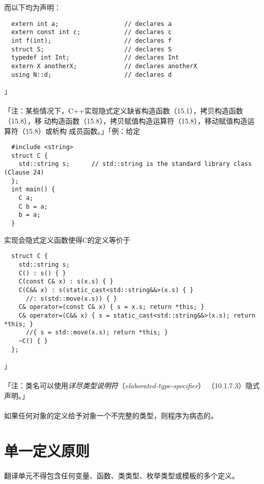 而以下均为声明：
\begin{lstlisting}
  extern int a;                  // declares a
  extern const int c;            // declares c
  int f(int);                    // declares f
  struct S;                      // declares S
  typedef int Int;               // declares Int
  extern X anotherX;             // declares anotherX
  using N::d;                    // declares d
\end{lstlisting}
」

\paragraph{}
「注：某些情况下，C++实现隐式定义缺省构造函数（15.1），拷贝构造函数（15.8），移
动构造函数（15.8），拷贝赋值构造运算符（15.8），移动赋值构造运算符（15.8）或析构
成员函数。」「例：给定
\begin{lstlisting}
  #include <string>
  struct C {
    std::string s;      // std::string is the standard library class (Clause 24)
  };
  int main() {
    C a;
    C b = a;
    b = a;
  }
\end{lstlisting}
实现会隐式定义函数使得C的定义等价于
\begin{lstlisting}
  struct C {
    std::string s;
    C() : s() { }
    C(const C& x) : s(x.s) { }
    C(C&& x) : s(static_cast<std::string&&>(x.s) { }
      //: s(std::move(x.s)) { }
    C& operator=(const C& x) { s = x.s; return *this; }
    C& operator=(C&& x) { s = static_cast<std::string&&>(x.s); return *this; }
      //{ s = std::move(x.s); return *this; }
    ~C() { }
  };
\end{lstlisting}」

\paragraph{}
「注：类名可以使用\textit{详尽类型说明符}（\textit{elaborated-type-specifier}）
（10.1.7.3）隐式声明。」

\paragraph{}
如果任何对象的定义给予对象一个不完整的类型，则程序为病态的。


\section{单一定义原则}

\paragraph{}
翻译单元不得包含任何变量、函数、类类型、枚举类型或模板的多个定义。

